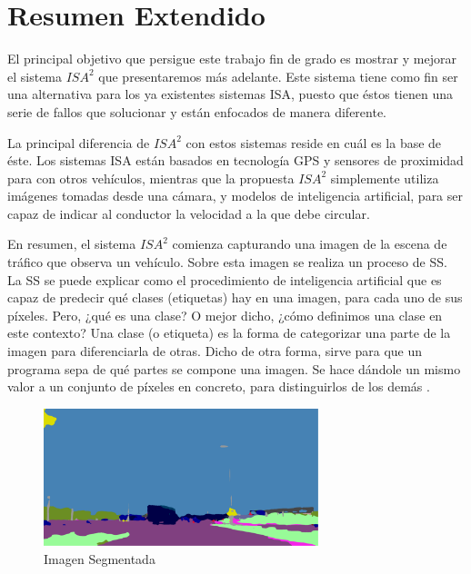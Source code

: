 \chapter{Resumen Extendido}

El principal objetivo que persigue este trabajo fin de grado es mostrar y mejorar el sistema $ISA^{2}$ que presentaremos más adelante. Este sistema tiene como fin ser una alternativa para los ya existentes sistemas \ac{ISA}, puesto que éstos tienen una serie de fallos que solucionar y están enfocados de manera diferente.

La principal diferencia de $ISA^{2}$ con estos sistemas reside en cuál es la base de éste. Los sistemas \ac{ISA} están basados en tecnología \ac{GPS} y sensores de proximidad para con otros vehículos, mientras que la propuesta $ISA^{2}$ simplemente utiliza imágenes tomadas desde una cámara, y modelos de inteligencia artificial, para ser capaz de indicar al conductor la velocidad a la que debe circular.

En resumen, el sistema $ISA^{2}$ comienza capturando una imagen de la escena de tráfico que observa un vehículo. Sobre esta imagen se realiza un proceso de \ac{SS}. La \ac{SS} se puede explicar como el procedimiento de inteligencia artificial que es capaz de predecir qué clases (etiquetas) hay en una imagen, para cada uno de sus píxeles. Pero, ¿qué es una clase? O mejor dicho, ¿cómo definimos una clase en este contexto? Una clase (o etiqueta) es la forma de categorizar una parte de la imagen para diferenciarla de otras. Dicho de otra forma, sirve para que un programa sepa de qué partes se compone una imagen. Se hace dándole un mismo valor a un conjunto de píxeles en concreto, para distinguirlos de los demás \cite{deeplab}.

\begin{figure}[H]
  \centering
  \includegraphics[width=8cm]{Figuras/Ejemplo_Imagen_Segmentada.eps}
  \caption{Imagen Segmentada}
    \label{fig:ImgSeg}
\end{figure}

